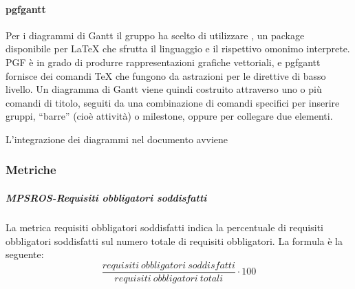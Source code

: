 \documentclass[../norme-di-progetto.tex]{subfiles}
\begin{document}

\paragraph{pgfgantt}%
\label{par:pgfgantt}

Per i diagrammi di Gantt il gruppo ha scelto di utilizzare , un package disponibile per \LaTeX{} che sfrutta il linguaggio  e il rispettivo omonimo interprete.
PGF è in grado di produrre rappresentazioni grafiche vettoriali, e pgfgantt fornisce dei comandi \TeX{} che fungono da astrazioni per le direttive di basso livello.
Un diagramma di Gantt viene quindi costruito attraverso uno o più comandi di titolo, seguiti da una combinazione di comandi specifici per inserire gruppi, ``barre'' (cioè attività) o milestone, oppure per collegare due elementi.

L'integrazione dei diagrammi nel documento avviene



\subsubsection{Metriche}%
\label{subs:sviluppo/metriche}

\subparagraph{MPSROS-Requisiti obbligatori soddisfatti}%
\label{subp:MPSROS-requisiti_obbligatori_soddisfatti}

La metrica requisiti obbligatori soddisfatti indica la percentuale di requisiti obbligatori soddisfatti sul numero totale di requisiti obbligatori. La formula è la seguente:
\[
  \frac{requisiti\ obbligatori\ soddisfatti}{requisiti\ obbligatori\ totali}\cdot 100
\]
\end{document}
